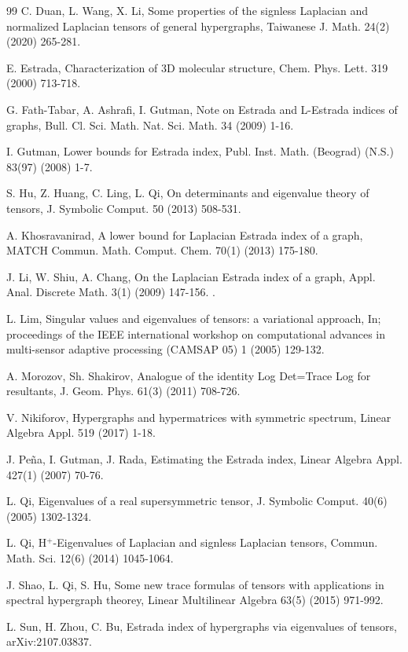 \documentclass[11pt]{article}
\begin{document}
\begin{thebibliography}{99}
 C. Duan, L. Wang, X. Li, Some properties of the signless Laplacian and normalized Laplacian tensors of general hypergraphs, Taiwanese J. Math. 24(2) (2020) 265-281.

 E. Estrada, Characterization of 3D molecular structure, Chem. Phys. Lett. 319 (2000) 713-718.

 G. Fath-Tabar, A. Ashrafi, I. Gutman, Note on Estrada and L-Estrada indices of graphs, Bull. Cl. Sci. Math. Nat. Sci. Math. 34 (2009) 1-16.

 I. Gutman, Lower bounds for Estrada index, Publ. Inst. Math. (Beograd) (N.S.) 83(97) (2008) 1-7.

 S. Hu, Z. Huang, C. Ling, L. Qi, On determinants and eigenvalue theory of tensors, J. Symbolic Comput. 50 (2013) 508-531.

 A. Khosravanirad, A lower bound for Laplacian Estrada index of a graph, MATCH Commun. Math. Comput. Chem. 70(1) (2013) 175-180.

 J. Li, W. Shiu, A. Chang, On the Laplacian Estrada index of a graph, Appl. Anal. Discrete Math. 3(1) (2009) 147-156. .

 L. Lim, Singular values and eigenvalues of tensors: a variational approach, In; proceedings of the IEEE international workshop on computational advances in multi-sensor adaptive processing (CAMSAP 05) 1 (2005) 129-132.

  A. Morozov, Sh. Shakirov, Analogue of the identity Log Det=Trace Log for resultants, J. Geom. Phys. 61(3) (2011) 708-726.

 V. Nikiforov, Hypergraphs and hypermatrices with symmetric spectrum,  Linear Algebra Appl. 519 (2017) 1-18.

 J. Pe\~{n}a, I. Gutman, J. Rada, Estimating the Estrada index, Linear Algebra Appl. 427(1) (2007) 70-76.

 L. Qi, Eigenvalues of a real supersymmetric tensor, J. Symbolic Comput. 40(6) (2005) 1302-1324.

 L. Qi, H$^+$-Eigenvalues of Laplacian and signless Laplacian tensors, Commun. Math. Sci. 12(6) (2014) 1045-1064.

 J. Shao, L. Qi, S. Hu, Some new trace formulas of tensors with applications in spectral hypergraph theorey, Linear Multilinear Algebra 63(5) (2015) 971-992.

 L. Sun, H. Zhou, C. Bu, Estrada index of hypergraphs via eigenvalues of tensors, arXiv:2107.03837.


\end{thebibliography}
\end{document}

